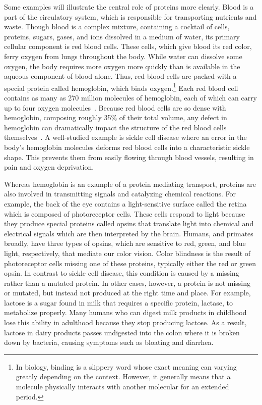 Some examples will illustrate the central role of proteins more clearly. Blood is a part of the circulatory system, which is responsible for transporting nutrients and waste. Though blood is a complex mixture, containing a cocktail of cells, proteins, sugars, gases, and ions dissolved in a medium of water, its primary cellular component is red blood cells. These cells, which give blood its red color, ferry oxygen from lungs throughout the body. While water can dissolve some oxygen, the body requires more oxygen more quickly than is available in the aqueous component of blood alone. Thus, red blood cells are packed with a special protein called hemoglobin, which binds oxygen.\footnote{In biology, binding is a slippery word whose exact meaning can varying greatly depending on the context. However, it generally means that a molecule physically interacts with another molecular for an extended period.} Each red blood cell contains as many as 270 million molecules of hemoglobin, each of which can carry up to four oxygen molecules~\cite{Pierig2008}. Because red blood cells are so dense with hemoglobin, composing roughly 35\% of their total volume, any defect in hemoglobin can dramatically impact the structure of the red blood cells themselves~\cite{Kanias2009}. A well-studied example is sickle cell disease where an error in the body's hemoglobin molecules deforms red blood cells into a characteristic sickle shape. This prevents them from easily flowing through blood vessels, resulting in pain and oxygen deprivation.

Whereas hemoglobin is an example of a protein mediating transport, proteins are also involved in transmitting signals and catalyzing chemical reactions. For example, the back of the eye contains a light-sensitive surface called the retina which is composed of photoreceptor cells. These cells respond to light because they produce special proteins called opsins that translate light into chemical and electrical signals which are then interpreted by the brain. Humans, and primates broadly, have three types of opsins, which are sensitive to red, green, and blue light, respectively, that mediate our color vision. Color blindness is the result of photoreceptor cells missing one of these proteins, typically either the red or green opsin. In contrast to sickle cell disease, this condition is caused by a missing rather than a mutated protein. In other cases, however, a protein is not missing or mutated, but instead not produced at the right time and place. For example, lactose is a sugar found in milk that requires a specific protein, lactase, to metabolize properly. Many humans who can digest milk products in childhood lose this ability in adulthood because they stop producing lactose. As a result, lactose in dairy products passes undigested into the colon where it is broken down by bacteria, causing symptoms such as bloating and diarrhea.


